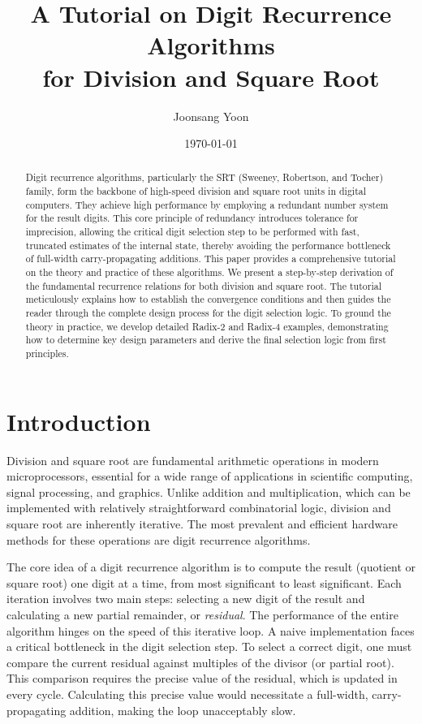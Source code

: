 \documentclass{article}
\title{A Tutorial on Digit Recurrence Algorithms\\
for Division and Square Root}
\author{Joonsang Yoon}
\date{\today}
\begin{document}
\maketitle

\begin{abstract}
  Digit recurrence algorithms, particularly the SRT (Sweeney, Robertson, and Tocher) family, form the backbone of high-speed division and square root units in digital computers.
  They achieve high performance by employing a redundant number system for the result digits.
  This core principle of redundancy introduces tolerance for imprecision, allowing the critical digit selection step to be performed with fast, truncated estimates of the internal state, thereby avoiding the performance bottleneck of full-width carry-propagating additions.
  This paper provides a comprehensive tutorial on the theory and practice of these algorithms.
  We present a step-by-step derivation of the fundamental recurrence relations for both division and square root.
  The tutorial meticulously explains how to establish the convergence conditions and then guides the reader through the complete design process for the digit selection logic.
  To ground the theory in practice, we develop detailed Radix-2 and Radix-4 examples, demonstrating how to determine key design parameters and derive the final selection logic from first principles.
\end{abstract}

\section{Introduction}
\label{sec:introduction}
Division and square root are fundamental arithmetic operations in modern microprocessors, essential for a wide range of applications in scientific computing, signal processing, and graphics.
Unlike addition and multiplication, which can be implemented with relatively straightforward combinatorial logic, division and square root are inherently iterative.
The most prevalent and efficient hardware methods for these operations are digit recurrence algorithms.

The core idea of a digit recurrence algorithm is to compute the result (quotient or square root) one digit at a time, from most significant to least significant.
Each iteration involves two main steps: selecting a new digit of the result and calculating a new partial remainder, or \emph{residual}.
The performance of the entire algorithm hinges on the speed of this iterative loop.
A naive implementation faces a critical bottleneck in the digit selection step.
To select a correct digit, one must compare the current residual against multiples of the divisor (or partial root).
This comparison requires the precise value of the residual, which is updated in every cycle.
Calculating this precise value would necessitate a full-width, carry-propagating addition, making the loop unacceptably slow.
\end{document}
